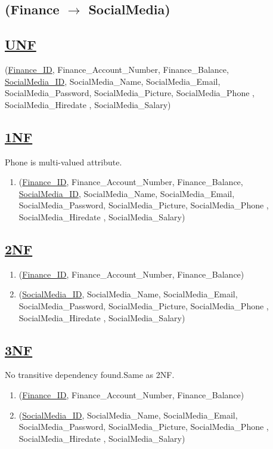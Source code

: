 \subsection{\texorpdfstring{\centering (Finance $\rightarrow$ SocialMedia)}{(Finance-SocialMedia)}}

\subsection*{\underline{UNF}}

(\underline{Finance\_ID}, Finance\_Account\_Number, Finance\_Balance,\\
\underline{SocialMedia\_ID}, SocialMedia\_Name, SocialMedia\_Email, SocialMedia\_Password, SocialMedia\_Picture, SocialMedia\_Phone ,  SocialMedia\_Hiredate , SocialMedia\_Salary)

\subsection*{\underline{1NF}}
Phone is multi-valued attribute.
\vskip 0.2in

\begin{enumerate}
    \item
          (\underline{Finance\_ID}, Finance\_Account\_Number, Finance\_Balance,\\
          \underline{SocialMedia\_ID}, SocialMedia\_Name, SocialMedia\_Email, SocialMedia\_Password, SocialMedia\_Picture, SocialMedia\_Phone ,  SocialMedia\_Hiredate , SocialMedia\_Salary)
\end{enumerate}

\subsection*{\underline{2NF}}
\begin{enumerate}
    \item (\underline{Finance\_ID}, Finance\_Account\_Number, Finance\_Balance)
    \item (\underline{SocialMedia\_ID}, SocialMedia\_Name, SocialMedia\_Email, SocialMedia\_Password, SocialMedia\_Picture, SocialMedia\_Phone ,  SocialMedia\_Hiredate , SocialMedia\_Salary)
\end{enumerate}

\subsection*{\underline{3NF}}
No transitive dependency found.Same as 2NF.
\begin{enumerate}
    \item (\underline{Finance\_ID}, Finance\_Account\_Number, Finance\_Balance)
    \item (\underline{SocialMedia\_ID}, SocialMedia\_Name, SocialMedia\_Email, SocialMedia\_Password, SocialMedia\_Picture, SocialMedia\_Phone ,  SocialMedia\_Hiredate , SocialMedia\_Salary)
\end{enumerate}

